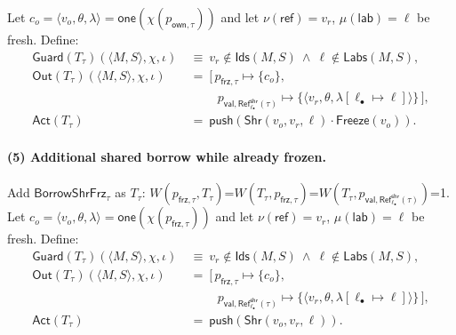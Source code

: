 \documentclass[sigconf]{acmart}
\begin{document}
Let $c_o=\langle v_o,\theta,\lambda\rangle=\mathsf{one}(\chi(p_{\mathsf{own},\tau}))$ and let $\nu(\mathsf{ref})=v_r$, $\mu(\mathsf{lab})=\ell$ be fresh.
Define:
\begin{align*}
\mathsf{Guard}(T_\tau)(\langle M,S\rangle,\chi,\iota)
&~\equiv~ v_r\notin \mathsf{Ids}(M,S)\ \wedge\ \ell\notin \mathsf{Labs}(M,S),\\
\mathsf{Out}(T_\tau)(\langle M,S\rangle,\chi,\iota)
&~=~ [\,p_{\mathsf{frz},\tau}\mapsto \{c_o\},\\
&\qquad\ \ p_{\mathsf{val},\mathsf{Ref}^{\mathsf{shr}}_{\ell_{\bullet}}(\tau)}\mapsto \{\langle v_r,\theta,\lambda[\ell_{\bullet}\mapsto \ell]\rangle\}\,],\\
\mathsf{Act}(T_\tau)
&~=~ \mathsf{push}(\mathsf{Shr}(v_o,v_r,\ell)\cdot \mathsf{Freeze}(v_o)).
\end{align*}

\paragraph{(5) Additional shared borrow while already frozen.}
Add $\mathsf{BorrowShrFrz}_\tau$ as $T_\tau$: 
$W(p_{\mathsf{frz},\tau},T_\tau)$=$W(T_\tau,p_{\mathsf{frz},\tau})$=$W(T_\tau,p_{\mathsf{val},\mathsf{Ref}^{\mathsf{shr}}_{\ell_{\bullet}}(\tau)})$=1.
Let $c_o=\langle v_o,\theta,\lambda\rangle=\mathsf{one}(\chi(p_{\mathsf{frz},\tau}))$ and let $\nu(\mathsf{ref})=v_r$, $\mu(\mathsf{lab})=\ell$ be fresh.
Define:
\begin{align*}
\mathsf{Guard}(T_\tau)(\langle M,S\rangle,\chi,\iota)
&~\equiv~ v_r\notin \mathsf{Ids}(M,S)\ \wedge\ \ell\notin \mathsf{Labs}(M,S),\\
\mathsf{Out}(T_\tau)(\langle M,S\rangle,\chi,\iota)
&~=~ [\,p_{\mathsf{frz},\tau}\mapsto \{c_o\},\\
&\qquad\ \ p_{\mathsf{val},\mathsf{Ref}^{\mathsf{shr}}_{\ell_{\bullet}}(\tau)}\mapsto \{\langle v_r,\theta,\lambda[\ell_{\bullet}\mapsto \ell]\rangle\}\,],\\
\mathsf{Act}(T_\tau)
&~=~ \mathsf{push}(\mathsf{Shr}(v_o,v_r,\ell)).
\end{align*}
\end{document}
